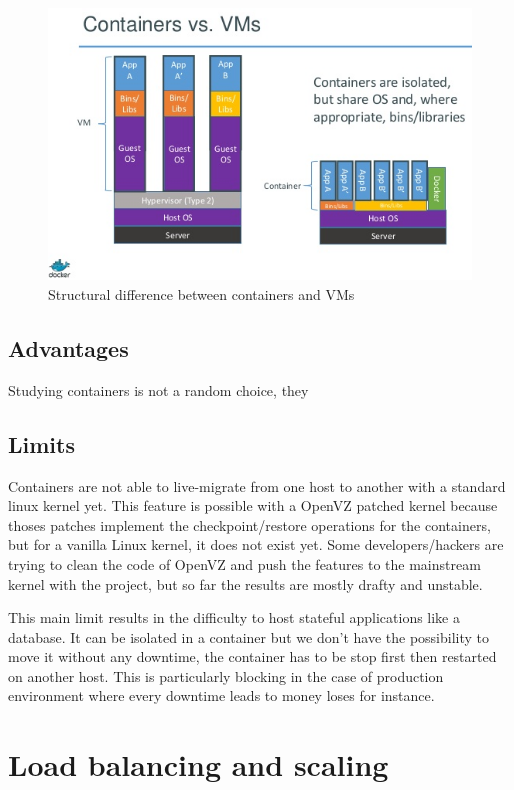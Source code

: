 \begin{figure}
	\includegraphics{./Images/containers_vs_vms.png}
	\caption{Structural difference between containers and VMs}
\end{figure}

\subsection{Advantages}

Studying containers is not a random choice, they

\subsection{Limits}

Containers are not able to live-migrate from one host to another with a
standard linux kernel yet. This feature is possible with a OpenVZ patched
kernel because thoses patches implement the checkpoint/restore operations for
the containers, but for a vanilla Linux kernel, it does not exist yet. Some
developers/hackers are trying to clean the code of OpenVZ and push the features
to the mainstream kernel with the \cite{websiteCRIU} project, but so far the
results are mostly drafty and unstable.

This main limit results in the difficulty to host stateful applications like a
database. It can be isolated in a container but we don't have the possibility
to move it without any downtime, the container has to be stop first then
restarted on another host. This is particularly blocking in the case of
production environment where every downtime leads to money loses for instance.

\section{Load balancing and scaling}

